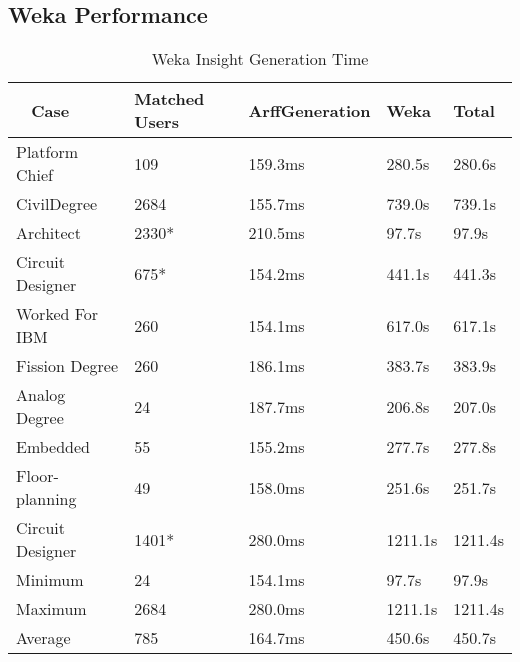 \subsection{Weka Performance}
\begin{table}[H]
  \centering
  \begin{tabular}{|p{17mm}|p{16mm}|p{18mm}|p{19mm}|p{20mm}|}
  \hline
  \
  Case&Matched Users&Arff\newline Generation&Weka&Total\\
  \hline\hline
  Platform Chief&109&159.3ms&280.5s&280.6s\\ \hline
  Civil\newline Degree&2684&155.7ms&739.0s&739.1s\\ \hline 
  Architect&2330*&210.5ms&97.7s&97.9s\\ \hline
  Circuit Designer&675*&154.2ms&441.1s&441.3s\\ \hline
  Worked For IBM&260&154.1ms&617.0s&617.1s\\ \hline
  Fission Degree&260&186.1ms&383.7s&383.9s\\ \hline
  Analog Degree&24&187.7ms&206.8s&207.0s\\ \hline
  Embedded&55&155.2ms&277.7s&277.8s\\ \hline
  Floor- \newline planning&49&158.0ms&251.6s&251.7s\\ \hline
  Circuit Designer&1401*&280.0ms&1211.1s&1211.4s\\ \hline
  \hline\hline
  Minimum&24&154.1ms&97.7s&97.9s\\ \hline
  Maximum&2684&280.0ms&1211.1s&1211.4s\\ \hline
  Average&785&164.7ms&450.6s&450.7s\\ \hline
  \end{tabular}
  \label{tab:weka-perf}
  \caption{Weka Insight Generation Time}
\end{table}